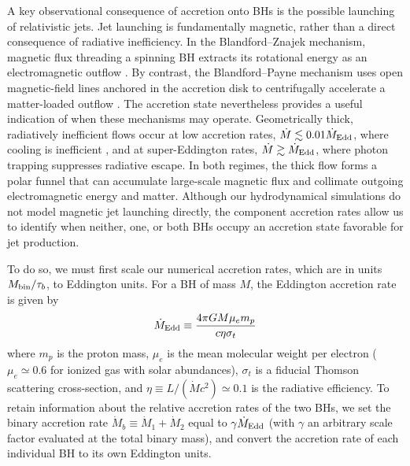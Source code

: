 \documentclass[fleqn,usenatbib]{mnras}
\begin{document}
A key observational consequence of accretion onto BHs is the possible
launching of relativistic jets. Jet launching is fundamentally magnetic,
rather than a direct consequence of radiative inefficiency. In the
Blandford--Znajek mechanism, magnetic flux threading a spinning BH
extracts its rotational energy as an electromagnetic outflow
\citep{blandford_znajek_1977}. By contrast, the Blandford--Payne mechanism
uses open magnetic-field lines anchored in the accretion disk to
centrifugally accelerate a matter-loaded outflow
\citep{blandford_payne_1982}. The accretion state nevertheless provides
a useful indication of when these mechanisms may operate.
Geometrically thick, radiatively inefficient flows occur at low
accretion rates, $\dot{M}\lesssim0.01\dot{M}_{\rm Edd}$, where cooling is
inefficient \citep{Muryel_lowedd_jet_21}, and at super-Eddington rates,
$\dot{M}\gtrsim\dot{M}_{\rm Edd}$, where photon trapping suppresses
radiative escape. In both regimes, the thick flow forms a polar funnel
that can accumulate large-scale magnetic flux and collimate outgoing
electromagnetic energy and matter. Although our hydrodynamical
simulations do not model magnetic jet launching directly, the component
accretion rates allow us to identify when neither, one, or both BHs
occupy an accretion state favorable for jet production.

To do so, we must first scale our numerical accretion rates, which are in units $M_{\rm{bin}}/\tau_b$, to Eddington units. For a BH of mass $M$, the Eddington accretion rate is given by
\begin{equation}\label{eqn:mdot_edd}
    \dot{M}_{\rm Edd} \equiv \frac{4\pi GM \mu_e m_p}{c \eta \sigma_t}
\end{equation}
where $m_p$ is the proton mass, $\mu_e$ is the mean molecular weight per electron ($\mu_e \simeq 0.6$ for ionized gas with solar abundances), $\sigma_t$ is a fiducial Thomson scattering cross-section, and $\eta \equiv L/(\dot{M}c^2) \simeq 0.1$ is the radiative efficiency. To retain information about the relative accretion rates of the two BHs, we set the binary accretion rate $\dot{M}_b \equiv \dot{M}_1 + \dot{M}_2$ equal to $\gamma \dot{M}_{\rm Edd}$ (with $\gamma$ an arbitrary scale factor evaluated at the total binary mass), and convert the accretion rate of each individual BH to its own Eddington units.
\end{document}

